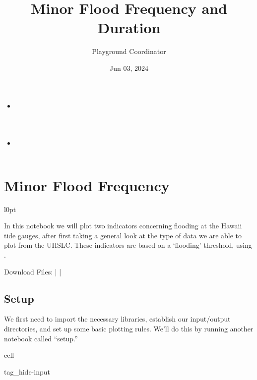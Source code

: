 \documentclass[letterpaper,10pt,english]{jupyterBook}
\title{Minor Flood Frequency and Duration}
\date{Jun 03, 2024}
\author{Playground Coordinator}
\begin{document}
\pagestyle{empty}
\sphinxmaketitle
\pagestyle{plain}
\sphinxtableofcontents
\pagestyle{normal}
\label{\detokenize{notebooks/Flood::doc}}

\begin{itemize}
\item {} 
\sphinxAtStartPar
{\hyperref[\detokenize{notebooks/FloodFrequency::doc}]{}}

\item {} 
\sphinxAtStartPar
{\hyperref[\detokenize{notebooks/FloodDuration::doc}]{}}

\end{itemize}

\sphinxstepscope


\part{Minor Flood Frequency}
\label{\detokenize{notebooks/FloodFrequency:minor-flood-frequency}}\label{\detokenize{notebooks/FloodFrequency::doc}}

\begin{wrapfigure}{l}{0pt}
\centering
\noindent{}
\end{wrapfigure}

\sphinxAtStartPar
In this notebook we will plot two indicators concerning flooding at the Hawaii tide gauges, after first taking a general look at the type of data we are able to plot from the UHSLC. These indicators are based on a ‘flooding’ threshold, using .

\sphinxAtStartPar
Download Files:
 |
 |


\chapter{Setup}
\label{\detokenize{notebooks/FloodFrequency:setup}}
\sphinxAtStartPar
We first need to import the necessary libraries, establish our input/output directories, and set up some basic plotting rules. We’ll do this by running another notebook called “setup.”

\begin{sphinxuseclass}{cell}
\begin{sphinxuseclass}{tag_hide-input}
\end{sphinxuseclass}
\end{sphinxuseclass}
\end{document}
